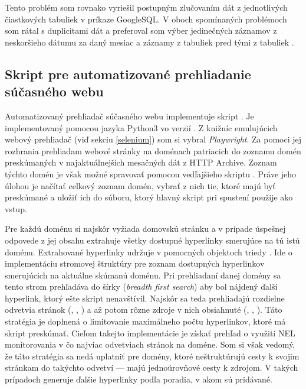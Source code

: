 Tento problém som rovnako vyriešil postupným zlučovaním dát z jednotlivých čiastkových tabuliek v príkaze GoogleSQL.
V oboch spomínaných problémoch som rátal s duplicitami dát a preferoval som výber jedinečných záznamov z neskoršieho dátumu za daný mesiac a záznamy z tabuliek  pred tými z tabuliek .


\subsection{Skript pre automatizované prehliadanie súčasného webu}

Automatizovaný prehliadač súčasného webu implementuje skript .
Je implementovaný pomocou jazyka Python3 vo verzií . Z knižníc emulujúcich webový 
prehliadač (viď sekciu \ref{selenium}) som si vybral \textit{Playwright}. 
Za pomoci jej rozhrania prehliadam webové stránky na doménach patriacich do zoznamu domén preskúmaných v najaktuálnejších mesačných dát z HTTP Archive.
Zoznam týchto domén je však možné spravovať pomocou vedľajšieho skriptu .
Práve jeho úlohou je načítať celkový zoznam domén, vybrať z nich tie, ktoré majú byť preskúmané a uložiť ich do súboru, ktorý hlavný skript pri spustení použije ako vstup.

Pre každú doménu si najskôr vyžiada domovskú stránku a v prípade úspešnej odpovede z jej obsahu extrahuje všetky dostupné hyperlinky smerujúce na tú istú doménu.
Extrahované hyperlinky udržuje v pomocných objektoch triedy .
Ide o implementáciu stromovej štruktúry pre zoznam dostupných hyperlinkov smerujúcich na aktuálne skúmanú doménu. 
Pri prehliadaní danej domény sa tento strom prehľadáva do šírky (\textit{breadth first search}) aby bol nájdený ďalší hyperlink, ktorý ešte skript nenavštívil.
Najskôr sa teda prehliadajú rozdielne odvetvia stránok (, , ) a až potom rôzne zdroje v nich obsiahnuté (, , ).
Táto stratégia je doplnená o limitovanie maximálneho počtu hyperlinkov, ktoré má skript preskúmať.
Cieľom takejto implementácie je získať prehľad o využití NEL monitorovania v čo najviac odvetviach stránok na doméne.
Som si však vedomý, že táto stratégia sa nedá uplatniť pre domény, ktoré neštruktúrujú cesty k svojim stránkam do takýchto odvetví --- majú jednoúrovňové cesty k zdrojom.
V takých prípadoch generuje  ďalšie hyperlinky podľa poradia, v akom sú pridávané.

